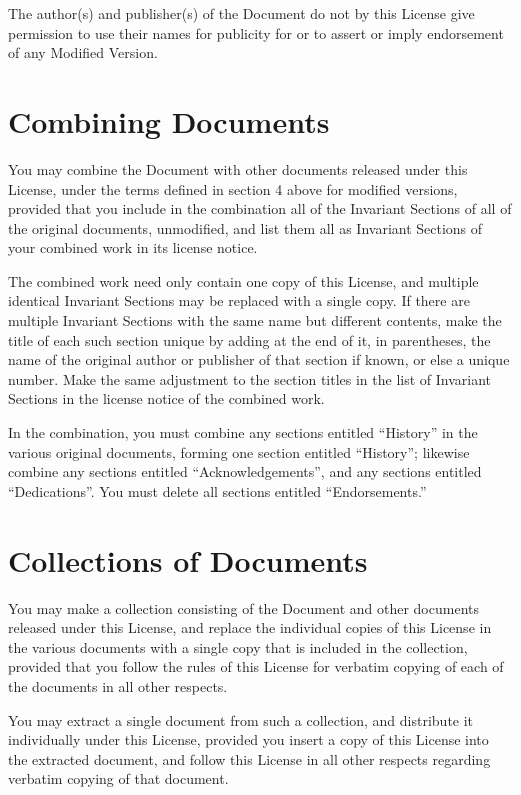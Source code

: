 \documentclass[oneside,a4paper]{book}
\begin{document}
The author(s) and publisher(s) of the Document do not by this License
give permission to use their names for publicity for or to assert or
imply endorsement of any Modified Version.


\section{Combining Documents}

You may combine the Document with other documents released under this
License, under the terms defined in section 4 above for modified
versions, provided that you include in the combination all of the
Invariant Sections of all of the original documents, unmodified, and
list them all as Invariant Sections of your combined work in its
license notice.

The combined work need only contain one copy of this License, and
multiple identical Invariant Sections may be replaced with a single
copy.  If there are multiple Invariant Sections with the same name but
different contents, make the title of each such section unique by
adding at the end of it, in parentheses, the name of the original
author or publisher of that section if known, or else a unique number.
Make the same adjustment to the section titles in the list of
Invariant Sections in the license notice of the combined work.

In the combination, you must combine any sections entitled ``History''
in the various original documents, forming one section entitled
``History''; likewise combine any sections entitled ``Acknowledgements'',
and any sections entitled ``Dedications''.  You must delete all sections
entitled ``Endorsements.''


\section{Collections of Documents}

You may make a collection consisting of the Document and other documents
released under this License, and replace the individual copies of this
License in the various documents with a single copy that is included in
the collection, provided that you follow the rules of this License for
verbatim copying of each of the documents in all other respects.

You may extract a single document from such a collection, and distribute
it individually under this License, provided you insert a copy of this
License into the extracted document, and follow this License in all
other respects regarding verbatim copying of that document.
\end{document}
